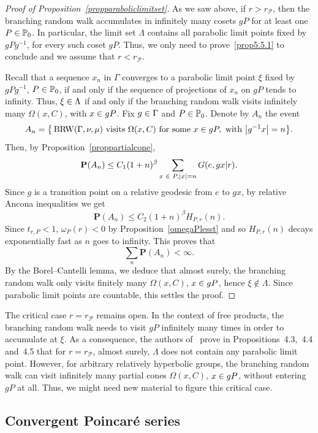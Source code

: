 \documentclass[AHL,Unicode,longabstracts]{cedram}
\newcommand{\bbP}{\mathbb{P}}
\newcommand{\bfP}{\mathbf{P}}
\newcommand{\clP}{\mathcal{P}}
\DeclareMathOperator{\BRW}{BRW}
\let\originalleft\left
\let\originalright\right
\renewcommand{\left}{\mathopen{}\mathclose\bgroup\originalleft}
\renewcommand{\right}{\aftergroup\egroup\originalright}
\let\oldin\in
\renewcommand{\in}{\mathchoice{\oldin}{\oldin}{\,\oldin\,}{\,\oldin\,}}
\begin{document}
\begin{proof}[{Proof of Proposition~\ref{propparaboliclimitset}}]
As we saw above, if $r>r_\clP$, then the branching random walk accumulates in infinitely many cosets $gP$ for at least one $P\in \bbP_0$. In particular, the limit set $\Lambda$ contains all parabolic limit points fixed by $gPg^{-1}$, for every such coset $gP$. Thus, we only need to prove~\eqref{prop5.5.1} to conclude and we assume that $r<r_\clP$.

Recall that a sequence $x_n$ in $\Gamma$ converges to a parabolic limit point $\xi$ fixed by $gPg^{-1}$, $P\in \bbP_0$, if and only if the sequence of projections of $x_n$ on $gP$ tends to infinity. Thus, $\xi\in \Lambda$ if and only if the branching random walk visits infinitely many $\Omega(x,C)$, with $x\in gP$. Fix $g\in \Gamma$ and $P\in \bbP_0$. Denote by $A_n$ the event
\[
A_n=\big\{\BRW(\Gamma,\nu,\mu)\text{ visits } \Omega(x,C) \text{ for some } x\in gP,\text{ with } \left|g^{-1}x\right|=n\big\}.
\]
Then, by Proposition~\ref{proppartialcone},
\[
\bfP(A_n)\leq C_1(1+n)^\beta \sum_{x\in P,|x|=n}G(e,gx|r).
\]
Since $g$ is a transition point on a relative geodesic from $e$ to $gx$, by relative Ancona inequalities we get
\[
\bfP(A_n)\leq C_2(1+n)^\beta H_{P,r}(n).
\]
Since $t_{r,P}<1$, $\omega_P(r)<0$ by Proposition~\ref{omegaPlesst} and so $H_{P,r}(n)$ decays exponentially fast as $n$ goes to infinity. This proves that
\[
\sum_{n}\bfP(A_n)<\infty.
\]
By the Borel--Cantelli lemma, we deduce that almost surely, the branching random walk only visits finitely many $\Omega(x,C)$, $x\in gP$, hence $\xi\notin \Lambda$. Since parabolic limit points are countable, this settles the proof.
\end{proof}



The critical case $r=r_\clP$ remains open. In the context of free products, the branching random walk needs to visit $gP$ infinitely many times in order to accumulate at $\xi$. As a consequence, the authors of~\cite{CandelleroGilchMuller} prove in Propositions~4.3,~4.4 and~4.5 that for $r=r_\clP$, almost surely, $\Lambda$ does not contain any parabolic limit point. However, for arbitrary relatively hyperbolic groups, the branching random walk can visit infinitely many partial cones $\Omega(x,C)$, $x\in gP$, without entering $gP$ at all. Thus, we might need new material to figure this critical case.



\subsection{Convergent Poincaré series}
\label{SectionconvergentPoincare}
\end{document}
